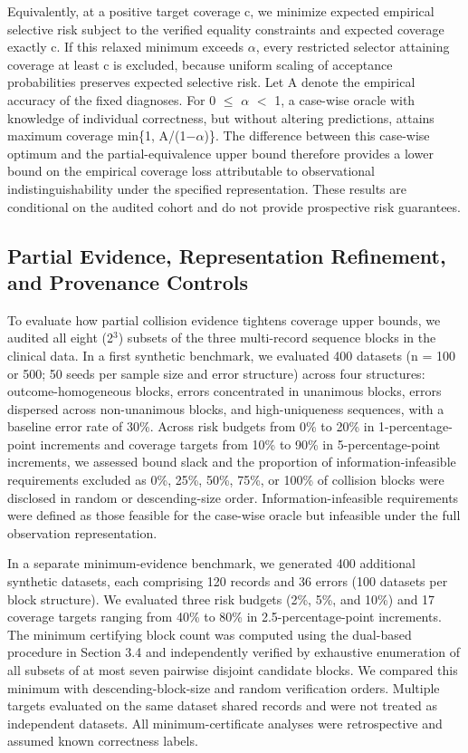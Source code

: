 \documentclass[letterpaper]{article}
\begin{document}
Equivalently, at a positive target coverage c, we minimize expected empirical selective risk subject to the verified equality constraints and expected coverage exactly c. If this relaxed minimum exceeds $\alpha$, every restricted selector attaining coverage at least c is excluded, because uniform scaling of acceptance probabilities preserves expected selective risk. Let A denote the empirical accuracy of the fixed diagnoses. For 0 $\leq$ $\alpha$ $<$ 1, a case-wise oracle with knowledge of individual correctness, but without altering predictions, attains maximum coverage min\{1, A/(1$-$$\alpha$)\}. The difference between this case-wise optimum and the partial-equivalence upper bound therefore provides a lower bound on the empirical coverage loss attributable to observational indistinguishability under the specified representation. These results are conditional on the audited cohort and do not provide prospective risk guarantees.

\subsection{Partial Evidence, Representation Refinement, and Provenance Controls}

To evaluate how partial collision evidence tightens coverage upper bounds, we audited all eight (2$^{3}$) subsets of the three multi-record sequence blocks in the clinical data. In a first synthetic benchmark, we evaluated 400 datasets (n = 100 or 500; 50 seeds per sample size and error structure) across four structures: outcome-homogeneous blocks, errors concentrated in unanimous blocks, errors dispersed across non-unanimous blocks, and high-uniqueness sequences, with a baseline error rate of 30\%. Across risk budgets from 0\% to 20\% in 1-percentage-point increments and coverage targets from 10\% to 90\% in 5-percentage-point increments, we assessed bound slack and the proportion of information-infeasible requirements excluded as 0\%, 25\%, 50\%, 75\%, or 100\% of collision blocks were disclosed in random or descending-size order. Information-infeasible requirements were defined as those feasible for the case-wise oracle but infeasible under the full observation representation.

In a separate minimum-evidence benchmark, we generated 400 additional synthetic datasets, each comprising 120 records and 36 errors (100 datasets per block structure). We evaluated three risk budgets (2\%, 5\%, and 10\%) and 17 coverage targets ranging from 40\% to 80\% in 2.5-percentage-point increments. The minimum certifying block count was computed using the dual-based procedure in Section 3.4 and independently verified by exhaustive enumeration of all subsets of at most seven pairwise disjoint candidate blocks. We compared this minimum with descending-block-size and random verification orders. Multiple targets evaluated on the same dataset shared records and were not treated as independent datasets. All minimum-certificate analyses were retrospective and assumed known correctness labels.
\end{document}
